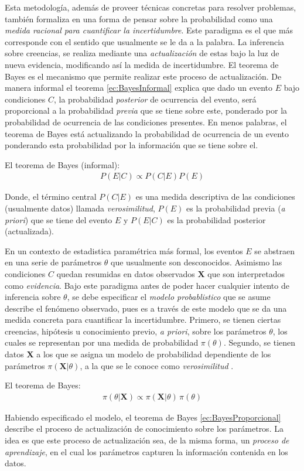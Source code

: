\documentclass[../Main/Main.tex]{subfiles}
\begin{document}
Esta metodología, además de proveer técnicas concretas para resolver problemas, también formaliza en una forma de pensar sobre la probabilidad como una \textit{medida racional para cuantificar la incertidumbre}. Este paradigma es el que más corresponde con el sentido que usualmente se le da a la palabra. La inferencia sobre creencias, se realiza mediante una \textit{actualización} de estas bajo la luz de nueva evidencia, modificando así la medida de incertidumbre. El teorema de Bayes es el mecanismo que permite realizar este proceso de actualización. De manera informal el teorema \eqref{ec:BayesInformal} explica que dado un evento $E$ bajo condiciones $C$, la probabilidad \textit{posterior} de ocurrencia del evento, será proporcional a la probabilidad \textit{previa} que se tiene sobre este, ponderado por la probabilidad de ocurrencia de las condiciones presentes. En menos palabras, el teorema de Bayes está  actualizando la probabilidad de ocurrencia de un evento ponderando esta probabilidad por la información que se tiene sobre el. 

\begin{theorem} El teorema de Bayes (informal):
\begin{align}
P(E|C) \propto P(C|E)P(E) \label{ec:BayesInformal}
\end{align}
\end{theorem}
Donde, el término central $P(C|E)$ es una medida descriptiva de las condiciones (usualmente datos) llamada \textit{verosimilitud}, $P(E)$ es la probabilidad previa (\textit{a priori}) que se tiene del evento $E$ y $P(E|C)$ es la probabilidad posterior (actualizada).

En un contexto de estadistica paramétrica más formal, los eventos $E$ se abstraen en una serie de parámetros $\theta$ que usualmente son desconocidos. Asimismo las condiciones $C$ quedan resumidas en datos observados $\mathbf{X}$ que son interpretados como \textit{evidencia}. 
Bajo este paradigma antes de poder hacer cualquier intento de inferencia sobre $\theta$, se debe especificar el \textit{modelo probablistico} que se asume describe el fenómeno observado, pues es a través de este modelo que se da una medida concreta para cuantificar la incertidumbre. Primero, se tienen ciertas creencias, hipótesis u conocimiento previo, \textit{a priori}, sobre los parámetros $\theta$, los cuales se representan por una medida de probabilidad $\pi(\theta)$. Segundo, se tienen datos $\mathbf{X}$ a los que se asigna un modelo de probabilidad dependiente de los parámetros $\pi(\mathbf{X}|\theta)$, a la que se le conoce como \textit{verosimilitud} \autocite{bernardo2003bayesian}.
\begin{theorem}
El teorema de Bayes:
\begin{align} 
	\pi(\theta|\mathbf{X}) \propto \pi(\mathbf{X}|\theta)\,\pi(\theta)\label{ec:BayesProporcional}
\end{align}
\end{theorem}
Habiendo especificado el modelo, el teorema de Bayes \eqref{ec:BayesProporcional} describe el proceso de actualización de conocimiento sobre los parámetros. La idea es que este proceso de actualización sea, de la misma forma, un \textit{proceso de aprendizaje}, en el cual los parámetros capturen la información contenida en los datos.
\end{document}
